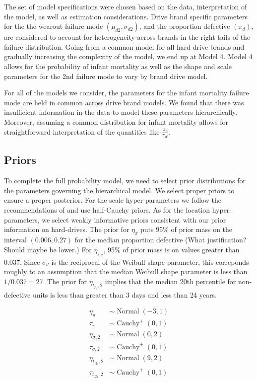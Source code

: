 \documentclass[12pt]{article}
\newcommand{\op}{\operatorname}
\begin{document}
The set of model specifications were chosen based on the data, interpretation of the model, as well as estimation considerations. Drive brand specific parameters for the the wearout failure mode $(\mu_{d2},\sigma_{d2})$, and the proportion defective $(\pi_d)$, are considered to account for heterogeneity across brands in the right tails of the failure distribution.  Going from a common model for all hard drive brands and gradually increasing the complexity of the model, we end up at Model 4.  Model 4 allows for the probability of infant mortality as well as the shape and scale parameters for the 2nd failure mode to vary by brand drive model.

For all of the models we consider, the parameters for the infant mortality failure mode are held in common across drive brand models. We found that there was insufficient information in the data to model these parameters hierarchically.  Moreover, assuming a common distribution for infant mortality allows for straightforward interpretation of the quantities like $\frac{\pi_{d}}{\pi_{d'}}$. 

\subsection{Priors}
To complete the full probability model, we need to select prior distributions for the parameters governing the hierarchical model. We select proper priors to ensure a proper posterior. For the scale hyper-parameters we follow the recommendations of \citet{gelman2014bayesian} and use half-Cauchy priors. As for the location hyper-parameters, we select weakly informative priors consistent with our prior information on hard-drives. The prior for $\eta_\pi$ puts 95\% of prior mass on the interval $(0.006, 0.27)$ for the median proportion defective (What justification? Should maybe be lower.) For $\eta__{\sigma, 2}$, 95\% of prior mass is on values greater than $0.037$. Since $\sigma_d$ is the reciprocal of the Weibull shape parameter, this correponds roughly to an assumption that the median Weibull shape parameter is less than $1/0.037 = 27$. The prior for $\eta_{t_{p_2},2}$ implies that the median 20th percentile for non-defective units is less than greater than 3 days and less than 24 years.

\begin{align*}
  \eta_{\pi} & \sim \op{Normal}(-3, 1)\\
  \tau_{\pi} & \sim \op{Cauchy}^+(0, 1)\\
  \eta_{\sigma ,2} & \sim \op{Normal}(0, 2)\\
  \tau_{\sigma ,2} & \sim \op{Cauchy}^+(0, 1)\\
  \eta_{t_{.2_2},2} & \sim \op{Normal}(9, 2)\\
  \tau_{t_{.2_2},2} & \sim \op{Cauchy}^+(0, 1)
 \end{align*} 
\end{document}
